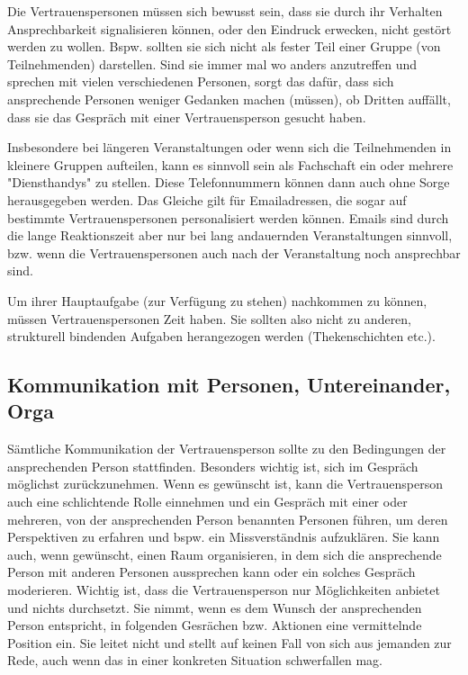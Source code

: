 \documentclass[DIV=calc]{scrartcl}
\begin{document}
Die Vertrauenspersonen müssen sich bewusst sein, dass sie durch ihr Verhalten Ansprechbarkeit signalisieren können, oder den Eindruck erwecken, nicht gestört werden zu wollen. Bspw. sollten sie sich nicht als fester Teil einer Gruppe (von Teilnehmenden) darstellen. Sind sie immer mal wo anders anzutreffen und sprechen mit vielen verschiedenen Personen, sorgt das dafür, dass sich ansprechende Personen weniger Gedanken machen (müssen), ob Dritten auffällt, dass sie das Gespräch mit einer Vertrauensperson gesucht haben.

Insbesondere bei längeren Veranstaltungen oder wenn sich die Teilnehmenden in kleinere Gruppen aufteilen, kann es sinnvoll sein als Fachschaft ein oder mehrere "Diensthandys" zu stellen. Diese Telefonnummern können dann auch ohne Sorge herausgegeben werden.
Das Gleiche gilt für Emailadressen, die sogar auf bestimmte Vertrauenspersonen personalisiert werden können. Emails sind durch die lange Reaktionszeit aber nur bei lang andauernden Veranstaltungen sinnvoll, bzw. wenn die Vertrauenspersonen auch nach der Veranstaltung noch ansprechbar sind.

Um ihrer Hauptaufgabe (zur Verfügung zu stehen) nachkommen zu können, müssen Vertrauenspersonen Zeit haben. Sie sollten also nicht zu anderen, strukturell bindenden Aufgaben herangezogen werden (Thekenschichten etc.).

\subsection{Kommunikation mit Personen, Untereinander, Orga}

Sämtliche Kommunikation der Vertrauensperson sollte zu den Bedingungen der ansprechenden Person stattfinden. Besonders wichtig ist, sich im Gespräch möglichst zurückzunehmen. Wenn es gewünscht ist, kann die Vertrauensperson auch eine schlichtende Rolle einnehmen und ein Gespräch mit einer oder mehreren, von der ansprechenden Person benannten Personen führen, um deren Perspektiven zu erfahren und bspw. ein Missverständnis aufzuklären. Sie kann auch, wenn gewünscht, einen Raum organisieren, in dem sich die ansprechende Person mit anderen Personen aussprechen kann oder ein solches Gespräch moderieren. Wichtig ist, dass die Vertrauensperson nur Möglichkeiten anbietet und nichts durchsetzt. Sie nimmt, wenn es dem Wunsch der ansprechenden Person entspricht, in folgenden Gesrächen bzw. Aktionen eine vermittelnde Position ein. Sie leitet nicht und stellt auf keinen Fall von sich aus jemanden zur Rede, auch wenn das in einer konkreten Situation schwerfallen mag.
\end{document}
